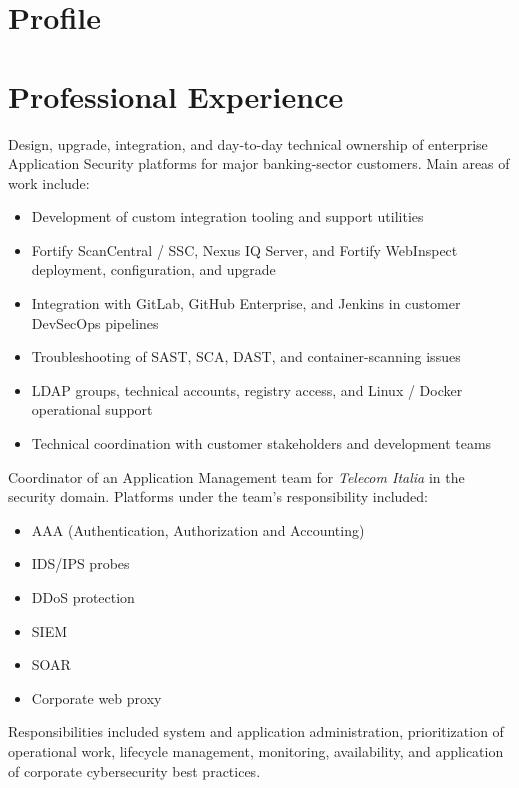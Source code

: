 \section{Profile}
\section{Professional Experience}
        {Design, upgrade, integration, and day-to-day technical ownership of enterprise Application Security platforms for major banking-sector customers. Main areas of work include:
          \begin{itemize}
          \item Development of custom integration tooling and support utilities
          \item Fortify ScanCentral / SSC, Nexus IQ Server, and Fortify WebInspect deployment, configuration, and upgrade
          \item Integration with GitLab, GitHub Enterprise, and Jenkins in customer DevSecOps pipelines
          \item Troubleshooting of SAST, SCA, DAST, and container-scanning issues
          \item LDAP groups, technical accounts, registry access, and Linux / Docker operational support
          \item Technical coordination with customer stakeholders and development teams
        \end{itemize}}
\vspace{3mm}
        {Coordinator of an Application Management team for \emph{Telecom Italia} in the security domain. Platforms under the team's responsibility included:
          \begin{itemize}
          \item AAA (Authentication, Authorization and Accounting)
          \item IDS/IPS probes
          \item DDoS protection
          \item SIEM
          \item SOAR
          \item Corporate web proxy
          \end{itemize}
          Responsibilities included system and application administration, prioritization of operational work, lifecycle management, monitoring, availability, and application of corporate cybersecurity best practices.}
